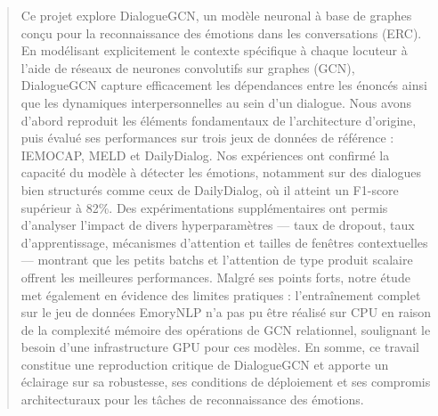 \documentclass[a4paper,11pt]{article}
\begin{document}
\begin{abstract}

Ce projet explore DialogueGCN, un modèle neuronal à base de graphes conçu pour la reconnaissance des émotions dans les conversations (ERC).
 En modélisant explicitement le contexte spécifique à chaque locuteur à l’aide de réseaux de neurones convolutifs sur graphes (GCN), DialogueGCN capture efficacement les dépendances entre les énoncés ainsi que les dynamiques interpersonnelles au sein d’un dialogue. 
 Nous avons d’abord reproduit les éléments fondamentaux de l’architecture d’origine, puis évalué ses performances sur trois jeux de données de référence : IEMOCAP, MELD et DailyDialog. 
 Nos expériences ont confirmé la capacité du modèle à détecter les émotions, notamment sur des dialogues bien structurés comme ceux de DailyDialog, où il atteint un F1-score supérieur à 82\%. 
 Des expérimentations supplémentaires ont permis d’analyser l’impact de divers hyperparamètres — taux de dropout, taux d’apprentissage, mécanismes d’attention et tailles de fenêtres contextuelles — montrant que les petits batchs et l’attention de type produit scalaire offrent les meilleures performances. Malgré ses points forts, notre étude met également en évidence des limites pratiques : l’entraînement complet sur le jeu de données EmoryNLP n’a pas pu être réalisé sur CPU en raison de la complexité mémoire des opérations de GCN relationnel, soulignant le besoin d’une infrastructure GPU pour ces modèles. En somme, ce travail constitue une reproduction critique de DialogueGCN et apporte un éclairage sur sa robustesse, ses conditions de déploiement et ses compromis architecturaux pour les tâches de reconnaissance des émotions.


\end{abstract}
\newpage













\end{document}
